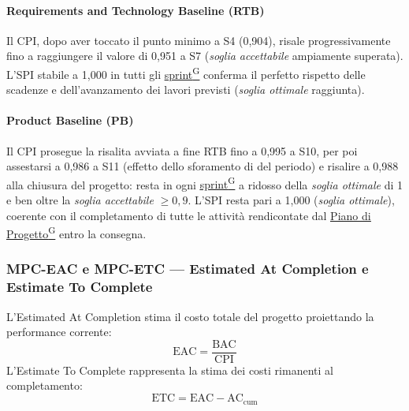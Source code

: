 \documentclass[a4paper,12pt]{article}
\providecommand{\glslink}[2]{\href{https://alittlebyte-19.github.io/Documentazione/glossario.html\#gls-#1}{\underline{#2}\textsuperscript{\scriptsize G}}}
\begin{document}
\paragraph*{Requirements and Technology Baseline (RTB)} Il CPI, dopo aver toccato il punto minimo a S4 (0,904), risale progressivamente fino a raggiungere il valore di 0,951 a S7 (\emph{soglia accettabile}  ampiamente superata). L'SPI stabile a 1,000 in tutti gli \glslink{sprint}{sprint} conferma il perfetto rispetto delle scadenze e dell'avanzamento dei lavori previsti (\emph{soglia ottimale} raggiunta).

\paragraph*{Product Baseline (PB)} Il CPI prosegue la risalita avviata a fine RTB fino a 0,995 a S10, per poi assestarsi a 0,986 a S11 (effetto dello sforamento di  del periodo) e risalire a 0,988 alla chiusura del progetto: resta in ogni \glslink{sprint}{sprint} a ridosso della \emph{soglia ottimale} di 1 e ben oltre la \emph{soglia accettabile} $\geq 0,9$. L'SPI resta pari a 1,000 (\emph{soglia ottimale}), coerente con il completamento di tutte le attività rendicontate dal \glslink{piano-di-progetto}{Piano di Progetto} entro la consegna.

\subsubsection{MPC-EAC e MPC-ETC — Estimated At Completion e Estimate To Complete}

L'Estimated At Completion stima il costo totale del progetto proiettando la performance corrente:
\[
  \text{EAC} = \frac{\text{BAC}}{\text{CPI}}
\]
L'Estimate To Complete rappresenta la stima dei costi rimanenti al completamento:
\[
  \text{ETC} = \text{EAC} - \text{AC}_\text{cum}
\]
\end{document}
